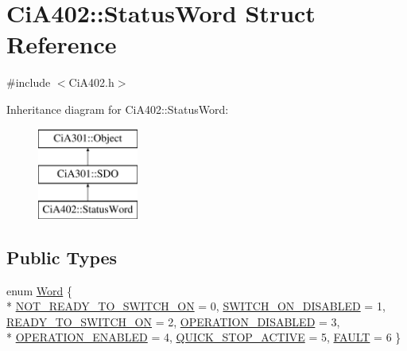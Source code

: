 \hypertarget{struct_ci_a402_1_1_status_word}{}\section{Ci\+A402\+:\+:Status\+Word Struct Reference}
\label{struct_ci_a402_1_1_status_word}


{\ttfamily \#include $<$Ci\+A402.\+h$>$}

Inheritance diagram for Ci\+A402\+:\+:Status\+Word\+:\begin{figure}[H]
\begin{center}
\leavevmode
\includegraphics[height=3.000000cm]{db/d05/struct_ci_a402_1_1_status_word}
\end{center}
\end{figure}
\subsection*{Public Types}
\begin{DoxyCompactItemize}
\item 
enum \hyperlink{struct_ci_a402_1_1_status_word_a9f47eab9ccb339144eb9c5848109b3e7}{Word} \{ \\*
\hyperlink{struct_ci_a402_1_1_status_word_a9f47eab9ccb339144eb9c5848109b3e7a600f185552846d816d78f5dc51c76cec}{N\+O\+T\+\_\+\+R\+E\+A\+D\+Y\+\_\+\+T\+O\+\_\+\+S\+W\+I\+T\+C\+H\+\_\+\+O\+N} = 0, 
\hyperlink{struct_ci_a402_1_1_status_word_a9f47eab9ccb339144eb9c5848109b3e7a8c5cd81d3a3bb123e2b76cd14d237adf}{S\+W\+I\+T\+C\+H\+\_\+\+O\+N\+\_\+\+D\+I\+S\+A\+B\+L\+E\+D} = 1, 
\hyperlink{struct_ci_a402_1_1_status_word_a9f47eab9ccb339144eb9c5848109b3e7ad1002bcf773ba6d2b925a13b3edb43d5}{R\+E\+A\+D\+Y\+\_\+\+T\+O\+\_\+\+S\+W\+I\+T\+C\+H\+\_\+\+O\+N} = 2, 
\hyperlink{struct_ci_a402_1_1_status_word_a9f47eab9ccb339144eb9c5848109b3e7a254f8875a4090d947d8f212046b03487}{O\+P\+E\+R\+A\+T\+I\+O\+N\+\_\+\+D\+I\+S\+A\+B\+L\+E\+D} = 3, 
\\*
\hyperlink{struct_ci_a402_1_1_status_word_a9f47eab9ccb339144eb9c5848109b3e7afad6e87d3f93d5d4e8cb38d7cd5b6286}{O\+P\+E\+R\+A\+T\+I\+O\+N\+\_\+\+E\+N\+A\+B\+L\+E\+D} = 4, 
\hyperlink{struct_ci_a402_1_1_status_word_a9f47eab9ccb339144eb9c5848109b3e7a9eb6608db79cd0442699d0483613c4db}{Q\+U\+I\+C\+K\+\_\+\+S\+T\+O\+P\+\_\+\+A\+C\+T\+I\+V\+E} = 5, 
\hyperlink{struct_ci_a402_1_1_status_word_a9f47eab9ccb339144eb9c5848109b3e7a7f043dc593925d89de0d9c383da079db}{F\+A\+U\+L\+T} = 6
 \}
\end{DoxyCompactItemize}
